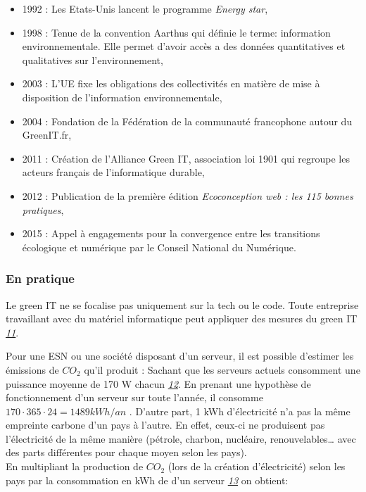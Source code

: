 \begin{itemize}
\tightlist
\item
  1992 : Les Etats-Unis lancent le programme \emph{Energy star},
\item
  1998 : Tenue de la convention Aarthus qui définie le terme:
  information environnementale. Elle permet d'avoir accès a des données
  quantitatives et qualitatives sur l'environnement,
\item
  2003 : L'UE fixe les obligations des collectivités en matière de mise
  à disposition de l'information environnementale,
\item
  2004 : Fondation de la Fédération de la communauté francophone autour
  du GreenIT.fr,
\item
  2011 : Création de l'Alliance Green IT, association loi 1901 qui
  regroupe les acteurs français de l'informatique durable,
\item
  2012 : Publication de la première édition \emph{Ecoconception web :
  les 115 bonnes pratiques},
\item
  2015 : Appel à engagements pour la convergence entre les transitions
  écologique et numérique par le Conseil National du Numérique.
\end{itemize}

\hypertarget{en-pratique}{%
\subsubsection{En pratique}\label{en-pratique}}

Le green IT ne se focalise pas uniquement sur la tech ou le code. Toute
entreprise travaillant avec du matériel informatique peut appliquer des
mesures du green IT
\emph{\href{https://club.greenit.fr/doc/2017-12-ClubGreenIT-RefGIT-checklist.v2.pdf}{11}}.

Pour une ESN ou une société disposant d'un serveur, il est possible
d'estimer les émissions de \(CO_2\) qu'il produit : Sachant que les
serveurs actuels consomment une puissance moyenne de 170 W chacun
\emph{\href{https://normandie.ademe.fr/sites/default/files/chiffres-cles-consommation-energetique-equipements-informatiques.pdf}{12}}.
En prenant une hypothèse de fonctionnement d'un serveur sur toute
l'année, il consomme \(170 \cdot 365 \cdot 24 = 1 489 kWh/an\) . D'autre
part, 1 kWh d'électricité n'a pas la même empreinte carbone d'un pays à
l'autre. En effet, ceux-ci ne produisent pas l'électricité de la même
manière (pétrole, charbon, nucléaire, renouvelables\ldots{} avec des
parts différentes pour chaque moyen selon les pays).\\
En multipliant la production de \(CO_2\) (lors de la création
d'électricité) selon les pays par la consommation en kWh de d'un serveur
\emph{\href{https://www.bilans-ges.ademe.fr/documentation/UPLOAD_DOC_FR/index.htm?moyenne_par_pays.htm}{13}}
on obtient:

